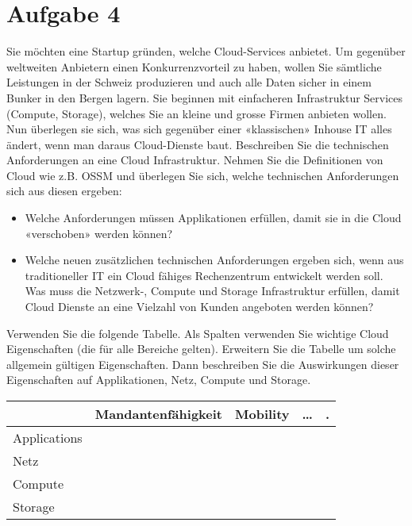\documentclass[11pt,titlepage]{article}
\newenvironment{shadedquotation}
 {\begin{shaded*}
  \quoting[leftmargin=0pt, vskip=0pt]
 }
 {\endquoting
 \end{shaded*}
}
\begin{document}
\section{Aufgabe 4}
\label{sec:Aufgabe-4}
\begin{shadedquotation}
  Sie möchten eine Startup gründen, welche Cloud-Services anbietet. Um gegenüber weltweiten
  Anbietern einen Konkurrenzvorteil zu haben, wollen Sie sämtliche Leistungen in der Schweiz
  produzieren und auch alle Daten sicher in einem Bunker in den Bergen lagern. Sie beginnen mit
  einfacheren Infrastruktur Services (Compute, Storage), welches Sie an kleine und grosse Firmen
  anbieten wollen. Nun überlegen sie sich, was sich gegenüber einer «klassischen» Inhouse IT alles ändert,
  wenn man daraus Cloud-Dienste baut. Beschreiben Sie die technischen Anforderungen an eine Cloud
  Infrastruktur. Nehmen Sie die Definitionen von Cloud wie z.B. OSSM und überlegen Sie sich, welche
  technischen Anforderungen sich aus diesen ergeben:


  \begin{itemize}
    \item Welche Anforderungen müssen Applikationen erfüllen, damit sie in die Cloud «verschoben»
    werden können?
    \item Welche neuen zusätzlichen technischen Anforderungen ergeben sich, wenn aus traditioneller IT
    ein Cloud fähiges Rechenzentrum entwickelt werden soll. Was muss die Netzwerk-, Compute
    und Storage Infrastruktur erfüllen, damit Cloud Dienste an eine Vielzahl von Kunden angeboten
    werden können?
  \end{itemize}

  Verwenden Sie die folgende Tabelle. Als Spalten verwenden Sie wichtige Cloud Eigenschaften (die für
  alle Bereiche gelten). Erweitern Sie die Tabelle um solche allgemein gültigen Eigenschaften. Dann
  beschreiben Sie die Auswirkungen dieser Eigenschaften auf Applikationen, Netz, Compute und Storage.
\end{shadedquotation}

\begin{tabular}{ |p{2cm}|p{3cm}|p{3cm}|p{3cm}|p{3cm}|  }
  \hline
  & Mandantenfähigkeit & Mobility & … & . \\
  \hline
  Applications & & & & \\
  Netz & & & & \\
  Compute & & & & \\
  Storage & & & & \\
\end{tabular}
\end{document}
